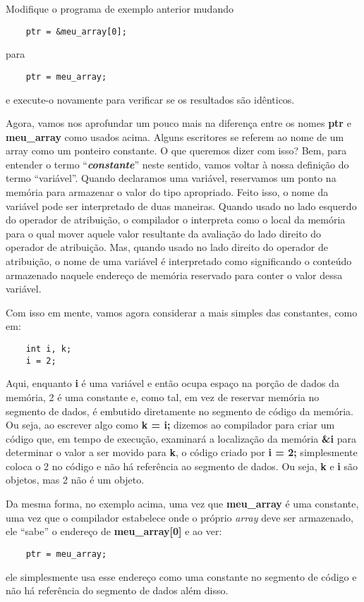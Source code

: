 Modifique o programa de exemplo anterior mudando
\begin{lstlisting}
	ptr = &meu_array[0];
\end{lstlisting}
para
\begin{lstlisting}
	ptr = meu_array;
\end{lstlisting}
e execute-o novamente para verificar se os resultados são idênticos.

Agora, vamos nos aprofundar um pouco mais na diferença entre os nomes \textbf{ptr} e \textbf{meu\_array} como usados acima. Alguns escritores se referem ao nome de um array como um ponteiro constante. O que queremos dizer com isso? Bem, para entender o termo ``\textbf{\textit{constante}}'' neste sentido, vamos voltar à nossa definição do termo ``variável''. Quando declaramos uma variável, reservamos um ponto na memória para armazenar o valor do tipo apropriado. Feito isso, o nome da variável pode ser interpretado de duas maneiras. Quando usado no lado esquerdo do operador de atribuição, o compilador o interpreta como o local da memória para o qual mover aquele valor resultante da avaliação do lado direito do operador de atribuição. Mas, quando usado no lado direito do operador de atribuição, o nome de uma variável é interpretado como significando o conteúdo armazenado naquele endereço de memória reservado para conter o valor dessa variável.

Com isso em mente, vamos agora considerar a mais simples das constantes, como em:
\begin{lstlisting}
	int i, k;
	i = 2;
\end{lstlisting}

Aqui, enquanto \textbf{i} é uma variável e então ocupa espaço na porção de dados da memória, 2 é uma constante e, como tal, em vez de reservar memória no segmento de dados, é embutido diretamente no segmento de código da memória. Ou seja, ao escrever algo como \textbf{k = i;} dizemos ao compilador para criar um código que, em tempo de execução, examinará a localização da memória \textbf{\&i} para determinar o valor a ser movido para \textbf{k}, o código criado por \textbf{i = 2;} simplesmente coloca o 2 no código e não há referência ao segmento de dados. Ou seja, \textbf{k} e \textbf{i} são objetos, mas 2 não é um objeto.

Da mesma forma, no exemplo acima, uma vez que \textbf{meu\_array} é uma constante, uma vez que o compilador estabelece onde o próprio \textit{array} deve ser armazenado, ele ``sabe'' o endereço de \textbf{meu\_array[0]} e ao ver:
\begin{lstlisting}
	ptr = meu_array;
\end{lstlisting}
ele simplesmente usa esse endereço como uma constante no segmento de código e não há referência do segmento de dados além disso.

